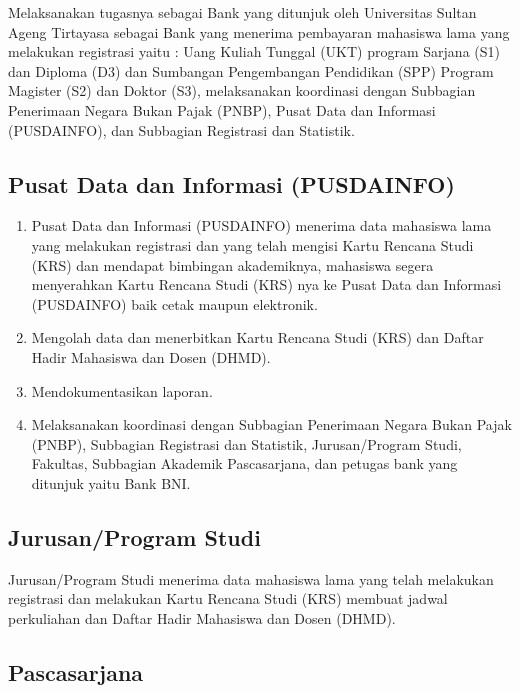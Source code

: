 \documentclass[
]{book}
\providecommand{\tightlist}{%
  \setlength{\itemsep}{0pt}\setlength{\parskip}{0pt}}
\begin{document}
Melaksanakan tugasnya sebagai Bank yang ditunjuk oleh Universitas Sultan Ageng Tirtayasa sebagai Bank
yang menerima pembayaran mahasiswa lama yang melakukan registrasi yaitu : Uang Kuliah Tunggal (UKT) program Sarjana (S1) dan Diploma (D3) dan Sumbangan Pengembangan Pendidikan (SPP) Program
Magister (S2) dan Doktor (S3), melaksanakan koordinasi dengan Subbagian Penerimaan Negara Bukan Pajak (PNBP), Pusat Data dan Informasi (PUSDAINFO), dan Subbagian Registrasi dan Statistik.

\hypertarget{pusat-data-dan-informasi-pusdainfo-1}{%
\subsection{Pusat Data dan Informasi (PUSDAINFO)}\label{pusat-data-dan-informasi-pusdainfo-1}}

\begin{enumerate}
\def\labelenumi{\arabic{enumi}.}
\tightlist
\item
  Pusat Data dan Informasi (PUSDAINFO) menerima data mahasiswa lama yang melakukan registrasi dan yang telah mengisi Kartu Rencana Studi (KRS) dan mendapat bimbingan akademiknya, mahasiswa segera menyerahkan Kartu Rencana Studi (KRS) nya ke Pusat Data dan Informasi (PUSDAINFO) baik cetak maupun elektronik.
\item
  Mengolah data dan menerbitkan Kartu Rencana Studi (KRS) dan Daftar Hadir Mahasiswa dan Dosen (DHMD).
\item
  Mendokumentasikan laporan.
\item
  Melaksanakan koordinasi dengan Subbagian Penerimaan Negara Bukan Pajak (PNBP), Subbagian Registrasi dan Statistik, Jurusan/Program Studi, Fakultas, Subbagian Akademik Pascasarjana, dan petugas bank yang ditunjuk yaitu Bank BNI.
\end{enumerate}

\hypertarget{jurusanprogram-studi}{%
\subsection{Jurusan/Program Studi}\label{jurusanprogram-studi}}

Jurusan/Program Studi menerima data mahasiswa lama yang telah melakukan registrasi dan melakukan
Kartu Rencana Studi (KRS) membuat jadwal perkuliahan dan Daftar Hadir Mahasiswa dan Dosen (DHMD).

\hypertarget{pascasarjana}{%
\subsection{Pascasarjana}\label{pascasarjana}}
\end{document}
